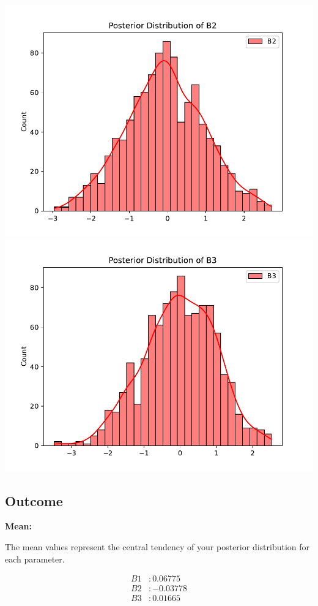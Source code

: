 \documentclass{article}
\begin{document}
\includegraphics[width=\textwidth]{snsSingle_2.pdf}
\includegraphics[width=\textwidth]{snsSingle_3.pdf}

\subsection{Outcome}

\textbf{Mean:}

The mean values represent the central tendency of your posterior distribution for each parameter.

\[
\begin{align*}
B1 & : 0.06775 \\
B2 & : -0.03778 \\
B3 & : 0.01665 \\
\end{align*}
\]
\end{document}
